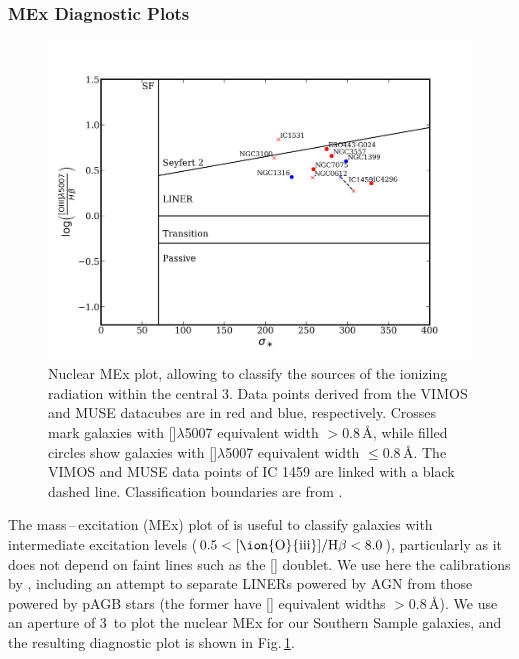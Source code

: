 \documentclass[a4paper,fleqn,usenatbib]{mnras}
\begin{document}
		\subsubsection{MEx Diagnostic Plots}
			\label{subsubsec:MEx}
			\begin{figure}
				\includegraphics[width=\columnwidth]{nuclear_MEx.png}
				\caption{Nuclear MEx plot, allowing to classify the sources of the ionizing radiation within the central 3\arcsec. Data points derived from the VIMOS and MUSE datacubes are in red and blue, respectively. Crosses mark galaxies with []$\lambda$5007 equivalent width $> 0.8$\,\AA, while filled circles show galaxies with []$\lambda$5007 equivalent width $\leqslant 0.8$\,\AA. The VIMOS and MUSE data points of IC 1459 are linked with a black dashed line. Classification boundaries are from \citet{Nyland2016}.}
				\label{fig:MEx}
			\end{figure}

			The mass\,--\,excitation (MEx) plot of \citet{Juneau2011} is useful to classify galaxies with intermediate excitation levels ($0.5 < \mathrm{[\ion{O}{iii}]/H\beta} < 8.0$), particularly as it does not depend on faint lines such as the [] doublet. We use here the calibrations by \citet{Nyland2016}, including an attempt to separate LINERs powered by AGN from those powered by pAGB stars (the former have [] equivalent widths $>0.8$\,\AA). We use an aperture of 3\arcsec\ to plot the nuclear MEx for our Southern Sample galaxies, and the resulting diagnostic plot is shown in Fig.\,\ref{fig:MEx}. 
\end{document}
